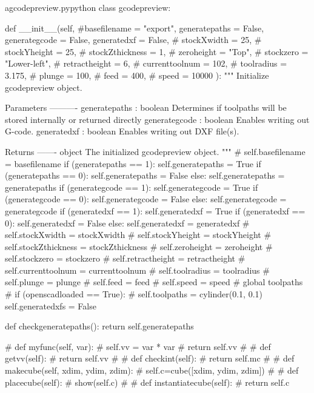 \documentclass{ltxdoc}
\begin{document}
\lstset{firstnumber=\thegcpy}
\begin{writecode}{a}{gcodepreview.py}{python}
class gcodepreview:

    def __init__(self, #basefilename = "export", 
                 generatepaths = False, 
                 generategcode = False, 
                 generatedxf = False, 
#                 stockXwidth = 25, 
#                 stockYheight = 25, 
#                 stockZthickness = 1, 
#                 zeroheight = "Top", 
#                 stockzero = "Lower-left", 
#                 retractheight = 6, 
#                 currenttoolnum = 102, 
#                 toolradius = 3.175, 
#                 plunge = 100, 
#                 feed = 400, 
#                 speed = 10000
                  ):
        """
        Initialize gcodepreview object.
    
        Parameters
        ----------
        generatepaths : boolean
                        Determines if toolpaths will be stored internally or returned directly
        generategcode : boolean
                        Enables writing out G-code.
        generatedxf   : boolean
                        Enables writing out DXF file(s).
        
        Returns
        -------
        object
            The initialized gcodepreview object.
        """
#        self.basefilename = basefilename
        if (generatepaths == 1):
            self.generatepaths = True
        if (generatepaths == 0):
            self.generatepaths = False
        else:
            self.generatepaths = generatepaths
        if (generategcode == 1):
            self.generategcode = True
        if (generategcode == 0):
            self.generategcode = False
        else:
            self.generategcode = generategcode
        if (generatedxf == 1):
            self.generatedxf = True
        if (generatedxf == 0):
            self.generatedxf = False
        else:
            self.generatedxf = generatedxf
#        self.stockXwidth = stockXwidth
#        self.stockYheight = stockYheight
#        self.stockZthickness = stockZthickness
#        self.zeroheight = zeroheight
#        self.stockzero = stockzero
#        self.retractheight = retractheight
#        self.currenttoolnum = currenttoolnum
#        self.toolradius = toolradius
#        self.plunge = plunge
#        self.feed = feed
#        self.speed = speed
#        global toolpaths
#        if (openscadloaded == True):
#            self.toolpaths = cylinder(0.1, 0.1)
        self.generatedxfs = False
       
    def checkgeneratepaths():
        return self.generatepaths

#    def myfunc(self, var):
#        self.vv = var * var
#        return self.vv
#
#    def getvv(self):
#        return self.vv
#        
#    def checkint(self):
#        return self.mc
#
#    def makecube(self, xdim, ydim, zdim):
#        self.c=cube([xdim, ydim, zdim])
#        
#    def placecube(self):
#        show(self.c)
#
#    def instantiatecube(self):
#        return self.c

\end{writecode}
\addtocounter{gcpy}{92}
\end{document}
